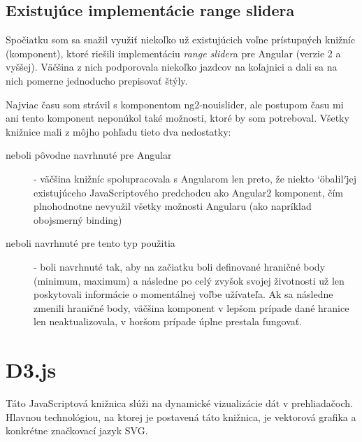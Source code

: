 \documentclass[
  digital, %
  twoside, %
  notable,   %
  nolof,   %
  nolot,   %
]{fithesis3}
\begin{document}
\subsection{Existujúce implementácie range slidera}
Spočiatku som sa snažil využiť niekoľko už existujúcich voľne prístupných knižníc (komponent), ktoré riešili implementáciu \textit{range slider}a pre Angular (verzie 2 a vyššej). Väčšina z nich podporovala niekoľko jazdcov na koľajnici a dali sa na nich pomerne jednoducho prepisovať štýly.

Najviac času som strávil s komponentom ng2-nouislider\cite{ng2nouislider}, ale postupom času mi ani tento komponent neponúkol také možnosti, ktoré by som potreboval. Všetky knižnice mali z môjho pohľadu tieto dva nedostatky:
\begin{description}
\item[neboli pôvodne navrhnuté pre Angular] - väčšina knižníc spolupracovala s Angularom len preto, že niekto \char`\"obalil\char`\" jej existujúceho JavaScriptového predchodcu ako Angular2 komponent, čím plnohodnotne nevyužil všetky možnosti Angularu (ako napríklad obojsmerný binding)
\item[neboli navrhnuté pre tento typ použitia] - boli navrhnuté tak, aby na začiatku boli definované hraničné body (minimum, maximum) a následne po celý zvyšok svojej životnosti už len poskytovali informácie o momentálnej voľbe užívateľa. Ak sa následne zmenili hraničné body, väčšina komponent v lepšom prípade dané hranice len neaktualizovala, v horšom prípade úplne prestala fungovať.
\end{description}

\section{D3.js}
Táto JavaScriptová knižnica slúži na dynamické vizualizácie dát v prehliadačoch. Hlavnou technológiou, na ktorej je postavená táto knižnica, je vektorová grafika a konkrétne značkovací jazyk SVG.
\end{document}

